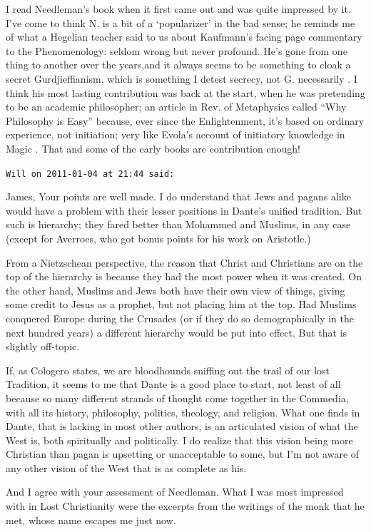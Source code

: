 \begin{footnotesize}
\begin{sffamily}
I read Needleman's book when it first came out and was quite impressed by it. I've come to think N. is a bit of a `popularizer' in the bad sense; he reminds me of what a Hegelian teacher said to us about Kaufmann's facing page commentary to the Phenomenology: seldom wrong but never profound. He's gone from one thing to another over the years,and it always seems to be something to cloak a secret Gurdjieffianism, which is something I detest secrecy, not G. necessarily . I think his most lasting contribution was back at the start, when he was pretending to be an academic philosopher; an article in Rev. of Metaphysics called ``Why Philosophy is Easy'' because, ever since the Enlightenment, it's based on ordinary experience, not initiation; very like Evola's account of initiatory knowledge in Magic . That and some of the early books are contribution enough!

\hfill

\texttt{Will on 2011-01-04 at 21:44 said:}

James, Your points are well made. I do understand that Jews and pagans alike would have a problem with their lesser positions in Dante's unified tradition. But such is hierarchy; they fared better than Mohammed and Muslims, in any case (except for Averroes, who got bonus points for his work on Aristotle.)

From a Nietzschean perspective, the reason that Christ and Christians are on the top of the hierarchy is because they had the most power when it was created. On the other hand, Muslims and Jews both have their own view of things, giving some credit to Jesus as a prophet, but not placing him at the top. Had Muslims conquered Europe during the Crusades (or if they do so demographically in the next hundred years) a different hierarchy would be put into effect. But that is slightly off-topic.

If, as Cologero states, we are bloodhounds sniffing out the trail of our lost Tradition, it seems to me that Dante is a good place to start, not least of all because so many different strands of thought come together in the Commedia, with all its history, philosophy, politics, theology, and religion. What one finds in Dante, that is lacking in most other authors, is an articulated vision of what the West is, both spiritually and politically. I do realize that this vision being more Christian than pagan is upsetting or unacceptable to some, but I'm not aware of any other vision of the West that is as complete as his.

And I agree with your assessment of Needleman. What I was most impressed with in Lost Christianity were the excerpts from the writings of the monk that he met, whose name escapes me just now.


\end{sffamily}
\end{footnotesize}
